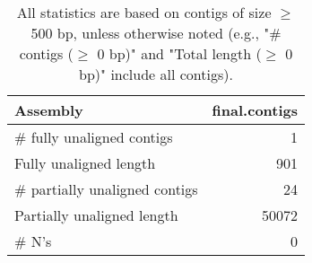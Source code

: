 \documentclass[12pt,a4paper]{article}
\begin{document}
\begin{table}[ht]
\begin{center}
\caption{All statistics are based on contigs of size $\geq$ 500 bp, unless otherwise noted (e.g., "\# contigs ($\geq$ 0 bp)" and "Total length ($\geq$ 0 bp)" include all contigs).}
\begin{tabular}{|l*{1}{|r}|}
\hline
Assembly & final.contigs \\ \hline
\# fully unaligned contigs & 1 \\ \hline
Fully unaligned length & 901 \\ \hline
\# partially unaligned contigs & 24 \\ \hline
Partially unaligned length & 50072 \\ \hline
\# N's & 0 \\ \hline
\end{tabular}
\end{center}
\end{table}
\end{document}
